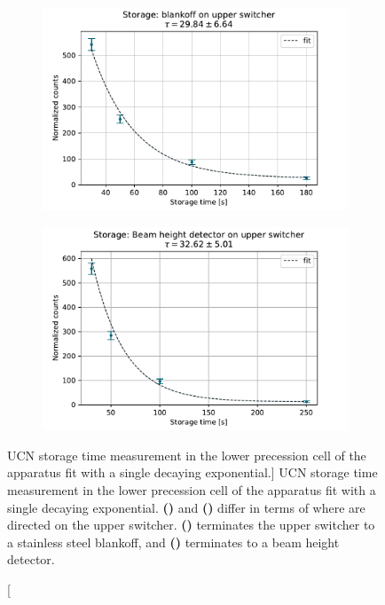 \begin{figure}
\centering
\begin{subfigure}{.5\textwidth} 
  \centering
  \includegraphics[width=\textwidth]{figures/store_blankoff_fit.pdf}
  \caption{}\label{subfig:2022_storage_blankoff}
\end{subfigure}%
\begin{subfigure}{.5\textwidth}
  \centering
  \includegraphics[width=\textwidth]{figures/store_with_beam_height_det_fit.pdf}
  \caption{}\label{subfig:2022_storage_beam_height_det}
\end{subfigure}
\caption
    [UCN storage time measurement in the lower precession cell of the apparatus fit with a single decaying exponential.]
    {UCN storage time measurement in the lower precession cell of the apparatus fit with a single decaying exponential. \textbf{()} and \textbf{()} differ in terms of where \ucn are directed on the upper switcher. \textbf{()} terminates the upper switcher to a stainless steel blankoff, and \textbf{()} terminates to a beam height \BZnS \ucn detector.}
\label{fig:2022_ucn_storage}
\end{figure}


